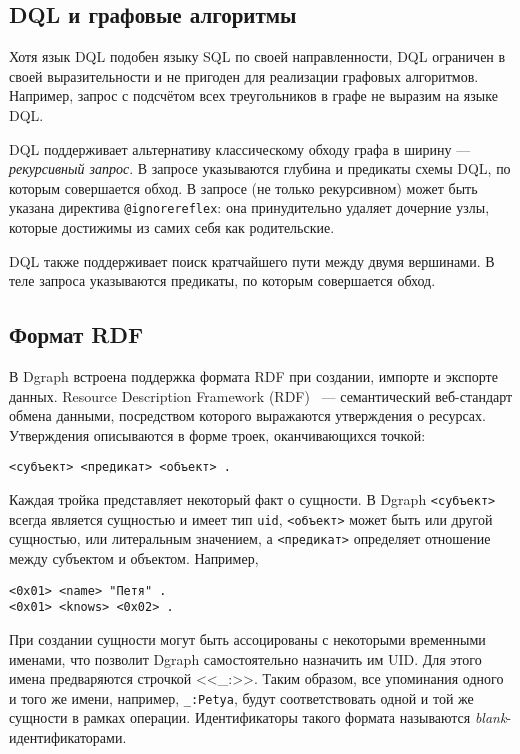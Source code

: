 \subsection{DQL и графовые алгоритмы}

Хотя язык DQL подобен языку SQL по своей направленности, DQL ограничен в своей выразительности и
не пригоден для реализации графовых алгоритмов. Например, запрос с подсчётом всех треугольников в
графе не выразим на языке DQL.

DQL поддерживает альтернативу классическому обходу графа в ширину --- \textit{рекурсивный запрос}.
В запросе указываются глубина и предикаты схемы DQL, по которым совершается обход. В запросе
(не только рекурсивном) может быть указана директива \texttt{@ignorereflex}: она принудительно
удаляет дочерние узлы, которые достижимы из самих себя как родительские.

DQL также поддерживает поиск кратчайшего пути между двумя вершинами. В теле запроса указываются
предикаты, по которым совершается обход.

\subsection{Формат RDF}

В Dgraph встроена поддержка формата RDF при создании, импорте и экспорте данных. Resource Description
Framework (RDF)~\cite{rdf} --- семантический веб-стандарт обмена данными, посредством которого
выражаются утверждения о ресурсах. Утверждения описываются в форме троек, оканчивающихся точкой:
\begin{Verbatim}
<субъект> <предикат> <объект> .
\end{Verbatim}

Каждая тройка представляет некоторый факт о сущности. В Dgraph \texttt{<субъект>} всегда является
сущностью и имеет тип \texttt{uid}, \texttt{<объект>} может быть или другой сущностью, или литеральным
значением, а \texttt{<предикат>} определяет отношение между субъектом и объектом. Например,
\begin{Verbatim}
<0x01> <name> "Петя" .
<0x01> <knows> <0x02> .
\end{Verbatim}

При создании сущности могут быть ассоцированы с некоторыми временными именами, что позволит Dgraph
самостоятельно назначить им UID. Для этого имена предваряются строчкой <<\_:>>. Таким образом,
все упоминания одного и того же имени, например, \texttt{\_:Petya}, будут соответствовать одной и
той же сущности в рамках операции. Идентификаторы такого формата называются \textit{blank}-идентификаторами.

